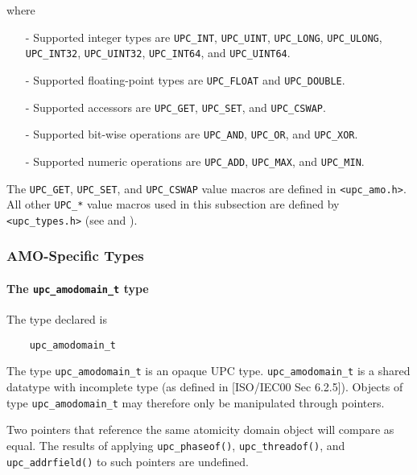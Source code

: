     where
\begin{itemize}
  \item[-] Supported integer types are {\tt UPC\_INT}, {\tt UPC\_UINT},
    {\tt UPC\_LONG}, {\tt UPC\_ULONG}, {\tt UPC\_INT32}, {\tt UPC\_UINT32},
    {\tt UPC\_INT64}, and {\tt UPC\_UINT64}.
  \item[-] Supported floating-point types are {\tt UPC\_FLOAT} and
    {\tt UPC\_DOUBLE}.
  \item[-] Supported accessors are {\tt UPC\_GET}, {\tt UPC\_SET}, and
    {\tt UPC\_CSWAP}.
  \item[-] Supported bit-wise operations are {\tt UPC\_AND}, {\tt UPC\_OR},
    and {\tt UPC\_XOR}.
  \item[-] Supported numeric operations are
    {\tt UPC\_ADD}, {\tt UPC\_MAX}, and {\tt UPC\_MIN}.
\end{itemize}

\np The {\tt UPC\_GET}, {\tt UPC\_SET}, and {\tt UPC\_CSWAP} value macros are
    defined in {\tt <upc\_amo.h>}.  All other {\tt UPC\_*} value macros used
    in this subsection are defined by {\tt <upc\_types.h>} (see
    \upcopsection{} and \upctypesection{}).

\subsubsection{AMO-Specific Types}
\label{upc-amo-types}

\paragraph{The {\tt upc\_amodomain\_t} type}

\npf The type declared is
\begin{verbatim}
    upc_amodomain_t
\end{verbatim}

\np The type {\tt upc\_amodomain\_t} is an opaque UPC type.
    {\tt upc\_amodomain\_t} is a shared datatype with incomplete type (as 
    defined in [ISO/IEC00 Sec 6.2.5]).  Objects of type {\tt upc\_amodomain\_t}
    may therefore only be manipulated through pointers.

\np Two pointers that reference the same atomicity domain object will compare
    as equal.  The results of applying {\tt upc\_phaseof()},
    {\tt upc\_threadof()}, and {\tt upc\_addrfield()} to such pointers are
    undefined.

